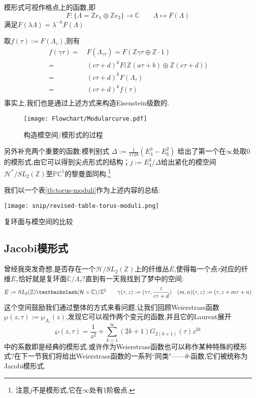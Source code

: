 \begin{remark}
	模形式可视作格点上的函数,即
	$$F: \{\Lambda= \mathbb{Z}e_1 \oplus \mathbb{Z}e_2 \} \longrightarrow \mathbb{C} \qquad \Lambda \longmapsto F(\Lambda)$$
	满足$F(\lambda \Lambda)= \lambda^{-k} F(\Lambda)$
	
	取$f(\tau):=F(\Lambda_{\tau})$,则有
	\begin{equation*}
	\begin{aligned}
	f(\gamma \tau) =\, & F(\Lambda_{\gamma\tau})=F(\mathbb{Z}\gamma\tau \oplus \mathbb{Z} \!\cdot\!\! 1)\\
	=\,& (c\tau + d)^k F\big(\mathbb{Z}(a\tau+b) \oplus \mathbb{Z}(c\tau +d)\big)		\\
	=\,& (c\tau + d)^k F(\Lambda_{\tau})		\\
	=\,& (c\tau + d)^k f(\tau)		\\
	\end{aligned}
	\end{equation*}
	事实上,我们也是通过上述方式来构造Eisenstein级数的.
\end{remark}
\begin{figure}[ht]
		\centering
		\texttt{[image: Flowchart/Modularcurve.pdf]}
	\caption{构造模空间/模形式的过程}
	\label{pic:Modularcurve}
\end{figure}
另外补充两个重要的函数:模判别式
$\Delta:=\frac{1}{1728}(E_4^3-E_6^2)$
给出了第一个在$\infty$处取0的模形式,由它可以得到尖点形式的结构；$j:=E_4^3/\Delta$给出紧化的模空间$\mathcal{H}^*/SL_2(\mathbb{Z})$至$\mathbb{PC}^1$的黎曼面同构.\footnote{注意$j$不是模形式,它在$\infty$处有1阶极点.}

我们以一个表\ref{tb:torus-moduli}作为上述内容的总结:
\begin{table}[ht]
	\centering
	\texttt{[image: snip/revised-table-torus-moduli.png]}
	\caption{复环面与模空间的比较}
	\label{tb:torus-moduli}
\end{table}
\subsection{Jacobi模形式}
曾经我突发奇想,是否存在一个$\mathcal{H}/SL_2(\mathbb{Z})$上的纤维丛$E$,使得每一个点$\tau$对应的纤维$E_\tau$恰好就是复环面$\mathbb{C}/\Lambda_{\tau}$?直到有一天我找到了梦中的空间:
$$E:=SL_2(\mathbb{Z})\textbackslash (\mathcal{H} \times \mathbb{C})/\mathbb{Z}^2 \qquad \gamma(\tau,z):= (\gamma \tau,\frac{z}{c\tau +d}) \quad (m,n)(\tau,z):=(\tau, z+m\tau+n)$$
这个空间鼓励我们通过整体的方式来看问题,让我们回顾Weierstrass函数$\wp(z,\tau):= \wp_{\Lambda_{\tau}}(z)$,发现它可以视作两个变元的函数,并且它的Laurent展开
$$\wp(z,\tau)=\frac{1}{z^2}+ \sum_{k=1}^{\infty}(2k+1) G_{2(k+1)}(\tau)z^{2k}$$
中的系数即是经典的模形式.或许作为Weierstrass函数也可以称作某种特殊的模形式?在下一节我们将给出Weierstrass函数的一系列``同类"——$\theta$-函数,它们被统称为Jacobi模形式.

